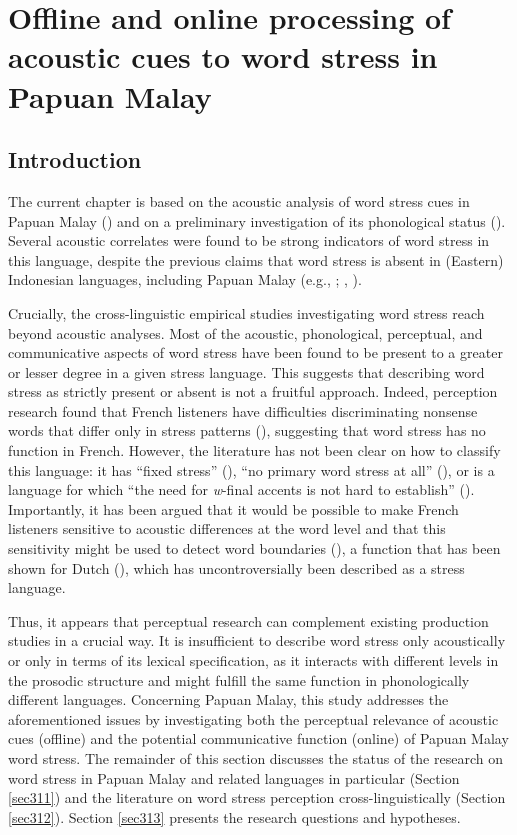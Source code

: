 \chapter{Offline and online processing of acoustic cues to word stress in Papuan Malay} \label{chPerc}

\section{Introduction}
The current chapter is based on the acoustic analysis of word stress cues in Papuan Malay () and on a preliminary investigation of its phonological status (\citealt{kaland_stress_2019}). Several acoustic correlates were found to be strong indicators of word stress in this language, despite the previous claims that word stress is absent in (Eastern) Indonesian languages, including Papuan Malay (e.g., \citealt{goedemans_no_2014}; \citealt{riesberg_perception_2018}, \citealt{himmelmann_preliminary_2018}).

Crucially, the cross-linguistic empirical studies investigating word stress reach beyond acoustic analyses. Most of the acoustic, phonological, perceptual, and communicative aspects of word stress have been found to be present to a greater or lesser degree in a given stress language. This suggests that describing word stress as strictly present or absent is not a fruitful approach. Indeed, perception research found that French listeners have difficulties discriminating nonsense words that differ only in stress patterns (\citealt{dupoux_destressing_1997}), suggesting that word stress has no function in French. However, the literature has not been clear on how to classify this language: it has ``fixed stress'' (\citealt[196]{dicristo_intonation_1998}), ``no primary word stress at all'' (\citealt[1515]{vanderhulst_deconstructing_2012}), or is a language for which ``the need for \textit{w}-final accents is not hard to establish'' (\citealt[258]{gussenhoven_phonology_2004}). Importantly, it has been argued that it would be possible to make French listeners sensitive to acoustic differences at the word level and that this sensitivity might be used to detect word boundaries (\citealt{dupoux_destressing_1997}), a function that has been shown for Dutch (\citealt{vroomen_cues_1996}), which has uncontroversially been described as a stress language.

Thus, it appears that perceptual research can complement existing production studies in a crucial way. It is insufficient to describe word stress only acoustically or only in terms of its lexical specification, as it interacts with different levels in the prosodic structure and might fulfill the same function in phonologically different languages. Concerning Papuan Malay, this study addresses the aforementioned issues by investigating both the perceptual relevance of acoustic cues (offline) and the potential communicative function (online) of Papuan Malay word stress. The remainder of this section discusses the status of the research on word stress in Papuan Malay and related languages in particular (Section \ref{sec311}) and the literature on word stress perception cross-linguistically (Section \ref{sec312}). Section \ref{sec313} presents the research questions and hypotheses.

